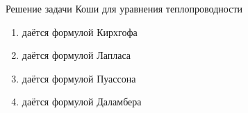 Решение задачи Коши для уравнения теплопроводности

\begin{enumerate}[label=\arabic*)]
    \item даётся формулой Кирхгофа
    \item даётся формулой Лапласа
    \item даётся формулой Пуассона
    \item даётся формулой Даламбера
\end{enumerate}

